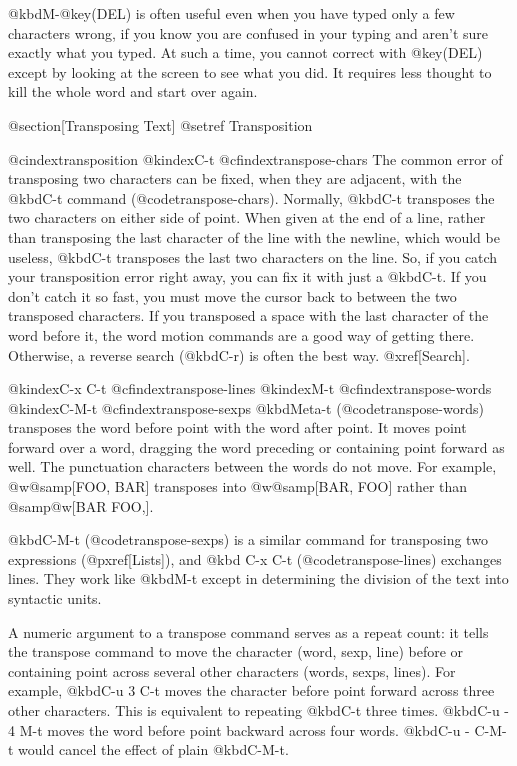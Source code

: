 {{{{{{{{{{{{{{{{{{  @kbd{M-@key(DEL)} is often useful even when you have typed only a few
characters wrong, if you know you are confused in your typing and aren't
sure exactly what you typed.  At such a time, you cannot correct with
@key(DEL) except by looking at the screen to see what you did.  It
requires less thought to kill the whole word and start over again.

@section[Transposing Text]
@setref Transposition

@cindex{transposition}
@kindex{C-t}
@cfindex{transpose-chars}
  The common error of transposing two characters can be fixed, when they
are adjacent, with the @kbd{C-t} command (@code{transpose-chars}).
Normally, @kbd{C-t} transposes the two characters on either side of point.
When given at the end of a line, rather than transposing the last character
of the line with the newline, which would be useless, @kbd{C-t} transposes
the last two characters on the line.  So, if you catch your transposition
error right away, you can fix it with just a @kbd{C-t}.  If you don't catch
it so fast, you must move the cursor back to between the two transposed
characters.  If you transposed a space with the last character of the word
before it, the word motion commands are a good way of getting there.
Otherwise, a reverse search (@kbd{C-r}) is often the best way.
@xref[Search].


@kindex{C-x C-t}
@cfindex{transpose-lines}
@kindex{M-t}
@cfindex{transpose-words}
@kindex{C-M-t}
@cfindex{transpose-sexps}
  @kbd{Meta-t} (@code{transpose-words}) transposes the word before point
with the word after point.  It moves point forward over a word, dragging
the word preceding or containing point forward as well.  The punctuation
characters between the words do not move.  For example, @w{@samp[FOO, BAR]}
transposes into @w{@samp[BAR, FOO]} rather than @samp{@w[BAR FOO,]}.

  @kbd{C-M-t} (@code{transpose-sexps}) is a similar command for
transposing two expressions (@pxref[Lists]), and @kbd {C-x C-t}
(@code{transpose-lines}) exchanges lines.  They work like @kbd{M-t} except
in determining the division of the text into syntactic units.

  A numeric argument to a transpose command serves as a repeat count:
it tells the transpose command to move the character (word, sexp, line)
before or containing point across several other characters (words, sexps,
lines).  For example, @kbd{C-u 3 C-t} moves the character before point
forward across three other characters.  This is equivalent to repeating
@kbd{C-t} three times.  @kbd{C-u - 4 M-t} moves the word before point
backward across four words.  @kbd{C-u - C-M-t} would cancel the effect of
plain @kbd{C-M-t}.

}}}}}}}}}}}}}}}}}}
